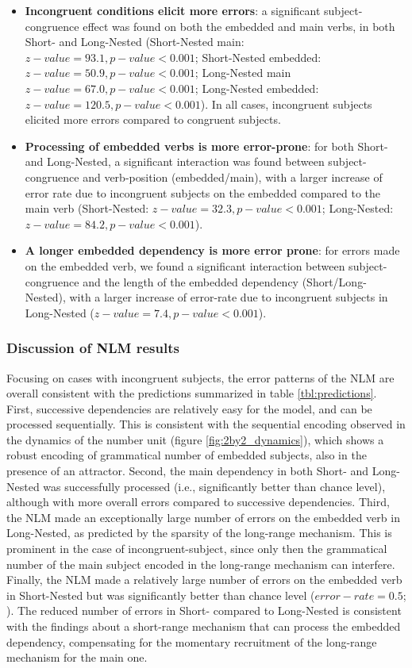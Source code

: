\begin{itemize}
    \item \textbf{Incongruent conditions elicit more errors}: a significant subject-congruence effect was found on both the embedded and main verbs, in both Short- and Long-Nested (Short-Nested main: $z-value=93.1, p-value<0.001$; Short-Nested embedded: $z-value=50.9, p-value<0.001$; Long-Nested main $z-value=67.0, p-value<0.001$; Long-Nested embedded: $z-value=120.5, p-value<0.001$). In all cases, incongruent subjects elicited more errors compared to congruent subjects.
    \item \textbf{Processing of embedded verbs is more error-prone}: for both Short- and Long-Nested, a significant interaction was found between subject-congruence and verb-position (embedded/main), with a larger increase of error rate due to incongruent subjects on the embedded compared to the main verb (Short-Nested: $z-value=32.3, p-value<0.001$; Long-Nested: $z-value=84.2, p-value<0.001$).
    \item \textbf{A longer embedded dependency is more error prone}: for errors made on the embedded verb, we found a significant interaction between subject-congruence and the length of the embedded dependency (Short/Long-Nested), with a larger increase of error-rate due to incongruent subjects in Long-Nested ($z-value=7.4, p-value<0.001$).
\end{itemize}
 
\vspace{10pt}

\subsubsection{Discussion of NLM results}
Focusing on cases with incongruent subjects, the error patterns of the NLM are overall consistent with the predictions summarized in table \ref{tbl:predictions}. First, successive dependencies are relatively easy for the model, and can be processed sequentially. This is consistent with the sequential encoding observed in the dynamics of the number unit (figure \ref{fig:2by2_dynamics}), which shows a robust encoding of grammatical number of embedded subjects, also in the presence of an attractor. Second, the main dependency in both Short- and Long-Nested was successfully processed (i.e., significantly better than chance level), although with more overall errors compared to successive dependencies. Third, the NLM made an exceptionally large number of errors on the embedded verb in Long-Nested, as predicted by the sparsity of the long-range mechanism. This is prominent in the case of incongruent-subject, since only then the grammatical number of the main subject encoded in the long-range mechanism can interfere. Finally, the NLM made a relatively large number of errors on the embedded verb in Short-Nested but was significantly better than chance level ($error-rate = 0.5$; ). The reduced number of errors in Short- compared to Long-Nested is consistent with the findings about a short-range mechanism that can process the embedded dependency, compensating for the momentary recruitment of the long-range mechanism for the main one. 

